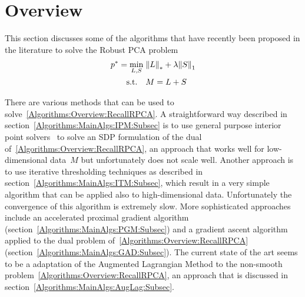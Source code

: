 


%


%


\section{Overview}
\label{Algorithms:Overview:Sec}

This section discusses some of the algorithms that have recently been proposed in the literature to solve the Robust PCA problem
%
\begin{align}
\begin{split}
p^* = \min_{L,S} \; &{\left\|L\right\|}_{*}^{} + \lambda {\left\|S\right\|}_{1}^{} \\
\text{s.t.} \quad &M = L+S
\end{split}
\label{Algorithms:Overview:RecallRPCA}
\end{align}

There are various methods that can be used to solve~\eqref{Algorithms:Overview:RecallRPCA}. A straightforward way described in section~\ref{Algorithms:MainAlgs:IPM:Subsec} is to use general purpose interior point solvers~\cite{Sturm:1999uq,Toh:1999kx} to solve an SDP formulation of the dual of~\eqref{Algorithms:Overview:RecallRPCA}, an approach that works well for low-dimensional data~$M$ but unfortunately does not scale well. Another approach is to use iterative thresholding techniques as described in section~\ref{Algorithms:MainAlgs:ITM:Subsec}, which result in a very simple algorithm that can be applied also to high-dimensional data. Unfortunately the convergence of this algorithm is extremely slow. More sophisticated approaches include an accelerated proximal gradient algorithm (section~\ref{Algorithms:MainAlgs:PGM:Subsec}) and a gradient ascent algorithm applied to the dual problem of~\eqref{Algorithms:Overview:RecallRPCA} (section~\ref{Algorithms:MainAlgs:GAD:Subsec}). The current state of the art seems to be a adaptation of the Augmented Lagrangian Method to the non-smooth problem~\eqref{Algorithms:Overview:RecallRPCA}, an approach that is discussed in section~\ref{Algorithms:MainAlgs:AugLag:Subsec}.



